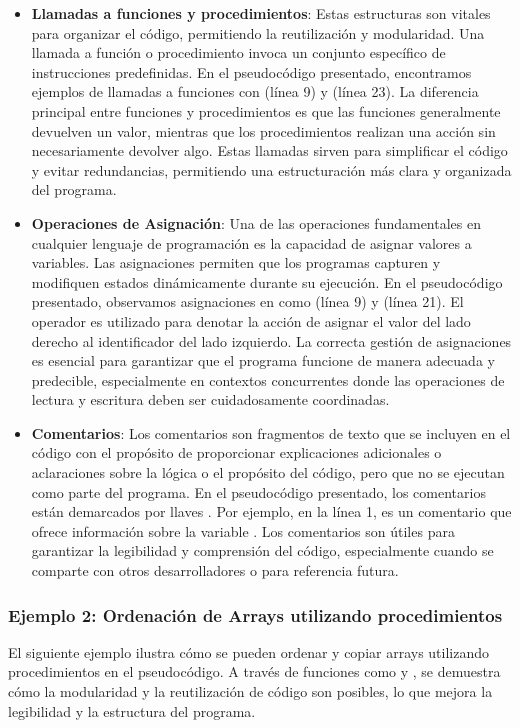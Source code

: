 \begin{itemize}
    \item \textbf{Llamadas a funciones y procedimientos}: Estas estructuras son vitales para organizar el código, permitiendo la reutilización y modularidad. Una llamada a función o procedimiento invoca un conjunto específico de instrucciones predefinidas. En el pseudocódigo presentado, encontramos ejemplos de llamadas a funciones con  (línea 9) y  (línea 23). La diferencia principal entre funciones y procedimientos es que las funciones generalmente devuelven un valor, mientras que los procedimientos realizan una acción sin necesariamente devolver algo. Estas llamadas sirven para simplificar el código y evitar redundancias, permitiendo una estructuración más clara y organizada del programa.

    \item \textbf{Operaciones de Asignación}: Una de las operaciones fundamentales en cualquier lenguaje de programación es la capacidad de asignar valores a variables. Las asignaciones permiten que los programas capturen y modifiquen estados dinámicamente durante su ejecución. En el pseudocódigo presentado, observamos asignaciones en como  (línea 9) y  (línea 21). El operador \code{:=} es utilizado para denotar la acción de asignar el valor del lado derecho al identificador del lado izquierdo. La correcta gestión de asignaciones es esencial para garantizar que el programa funcione de manera adecuada y predecible, especialmente en contextos concurrentes donde las operaciones de lectura y escritura deben ser cuidadosamente coordinadas.

    \item \textbf{Comentarios}: Los comentarios son fragmentos de texto que se incluyen en el código con el propósito de proporcionar explicaciones adicionales o aclaraciones sobre la lógica o el propósito del código, pero que no se ejecutan como parte del programa. En el pseudocódigo presentado, los comentarios están demarcados por llaves \code{\{\}}. Por ejemplo, en la línea 1,  es un comentario que ofrece información sobre la variable . Los comentarios son útiles para garantizar la legibilidad y comprensión del código, especialmente cuando se comparte con otros desarrolladores o para referencia futura.
\end{itemize}

\subsubsection{Ejemplo 2: Ordenación de Arrays utilizando procedimientos}\label{subsubsec:pseudoAnalisisEjemplo2}
El siguiente ejemplo ilustra cómo se pueden ordenar y copiar arrays utilizando procedimientos en el pseudocódigo. A través de funciones como  y , se demuestra cómo la modularidad y la reutilización de código son posibles, lo que mejora la legibilidad y la estructura del programa.


